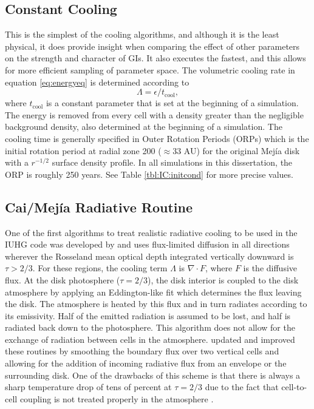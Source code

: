 \subsection{Constant Cooling} \label{sec:constantcooling}

This is the simplest of the cooling algorithms, and although it is the least physical, it does provide insight when comparing the effect of other parameters on the strength and character of GIs. It also executes the fastest, and this allows for more efficient sampling of parameter space. The volumetric cooling rate in equation \eqref{eq:energyeq} is determined according to
\begin{equation}
\Lambda = \epsilon / t_{\mathrm{cool}},\label{eq:constcool}
\end{equation}
where $t_{\mathrm{cool}}$ is a constant parameter that is set at the beginning of a simulation. The energy is removed from every cell with a density greater than the negligible background density, also determined at the beginning of a simulation. The cooling time is generally specified in Outer Rotation Periods (ORPs) which is the initial rotation period at radial zone 200 ($\approx 33$ AU) for the original Mej\'{i}a disk with a $r^{-1/2}$ surface density profile. In all simulations in this dissertation, the ORP is roughly 250 years. See Table \ref{tbl:IC:initcond} for more precise values.

\subsection{Cai/Mej\'{i}a Radiative Routine}\label{sec:caimejiacooling}

One of the first algorithms to treat realistic radiative cooling to be used in the IUHG code was developed by \citet{mejiaphd2004} and uses flux-limited diffusion in all directions wherever the Rosseland mean optical depth integrated vertically downward is $\tau > 2/3$. For these regions, the cooling term $\Lambda$ is $\nabla \cdot F$, where $F$ is the diffusive flux.  At the disk photosphere ($\tau = 2/3$), the disk interior is coupled to the disk atmosphere by applying an Eddington-like fit which determines the flux leaving the disk. The atmosphere is heated by this flux and in turn radiates according to its emissivity. Half of the emitted radiation is assumed to be lost, and half is radiated back down to the photosphere. This algorithm does not allow for the exchange of radiation between cells in the atmosphere. 
\citet{caiphd2006} updated and improved these routines by smoothing the boundary flux over two vertical cells and allowing for the addition of incoming radiative flux from an envelope or the surrounding disk. One of the drawbacks of this scheme is that there is always a sharp temperature drop of tens of percent at $\tau = 2/3$ due to the fact that cell-to-cell coupling is not treated properly in the atmosphere \citep{boley2006,boley2007b}.

